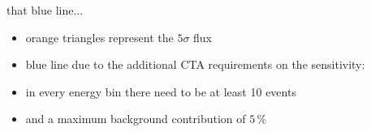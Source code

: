 \documentclass[8pt]{beamer}
\begin{document}
    \begin{frame}{that blue line...}
        \begin{itemize}
            \item orange triangles represent the $5\sigma$ flux
            \item blue line due to the additional CTA requirements on the sensitivity:
            \item in every energy bin there need to be at least 10 events
            \item and a maximum background contribution of $5\,\%$
        \end{itemize}
    \end{frame}
\end{document}
